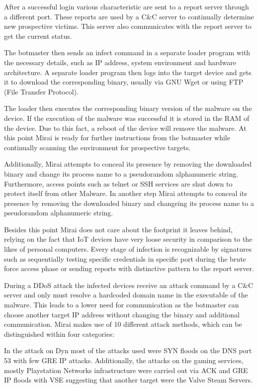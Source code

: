 After a successful login various characteristic are sent to a report server through a different port. These reports are used by a C\&C server to continually determine new prospective victims. This server also communicates with the report server to get the current status.

The botmaster then sends an infect command in a separate loader program with the necessary details, such as IP address, system environment and hardware architecture. A separate loader program then logs into the target device and gets it to download the corresponding binary, usually via GNU Wget or using FTP (File Transfer Protocol). 

The loader then executes the corresponding binary version of the malware on the device. If the execution of the malware was successful it is stored in the RAM of the device. Due to this fact, a reboot of the device will remove the malware. At this point Mirai is ready for further instructions from the botmaster while continually scanning the environment for prospective targets.

Additionally, Mirai attempts to conceal its presence by removing the downloaded binary and change its process name to a pseudorandom alphanumeric string. Furthermore, access points such as telnet or SSH services are shut down to protect itself from other Malware. In another step Mirai attempts to conceal its presence by removing the downloaded binary and changeing its process name to a pseudorandom alphanumeric string.

Besides this point Mirai does not care about the footprint it leaves behind, relying on the fact that IoT devices have very loose security in comparison to the likes of personal computers. Every stage of infection is recognizable by signatures such as sequentially testing specific credentials in specific port during the brute force access phase or sending reports with distinctive pattern to the report server.

During a DDoS attack the infected devices receive an attack command by a C\&C server and only must resolve a hardcoded domain name in the executable of the malware. This leads to a lower need for communication as the botmaster can choose another target IP address without changing the binary and additional communication.
Mirai makes use of 10 different attack methods, which can be distinguished within four categories:

In the attack on Dyn most of the attacks used were SYN floods on the DNS port 53 with few GRE IP attacks. Additionally, the attacks on the gaming services, mostly Playstation Networks infrastructure were carried out via ACK and GRE IP floods with VSE suggesting that another target were the Valve Steam Servers.

